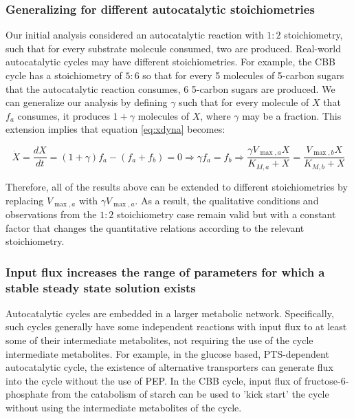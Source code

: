     \subsubsection{Generalizing for different autocatalytic stoichiometries}
    Our initial analysis considered an autocatalytic reaction with $1:2$ stoichiometry, such that for every substrate molecule consumed, two are produced.
    Real-world autocatalytic cycles may have different stoichiometries.
    For example, the CBB cycle has a stoichiometry of $5:6$ so that for every 5 molecules of 5-carbon sugars that the autocatalytic reaction consumes, 6 5-carbon sugars are produced.
    We can generalize our analysis by defining $\gamma$ such that for every molecule of $X$ that $f_a$ consumes, it produces $1+\gamma$ molecules of $X$, where $\gamma$ may be a fraction.
    This extension implies that equation \eqref{eq:xdyna} becomes:

    \begin{equation*}
      \dot X = \frac{dX}{dt} = (1+\gamma)f_a - (f_a + f_b) = 0 \Rightarrow \gamma f_a = f_b \Rightarrow \frac{\gamma V_{\max,a}X}{K_{M,a}+X}=\frac{V_{\max,b}X}{K_{M,b}+X}
    \end{equation*}

    Therefore, all of the results above can be extended to different stoichiometries by replacing $V_{\max,a}$ with $\gamma V_{\max,a}$.
    As a result, the qualitative conditions and observations from the $1:2$ stoichiometry case remain valid but with a constant factor that changes the quantitative relations according to the relevant stoichiometry.
\subsubsection{Input flux increases the range of parameters for which a stable steady state solution exists}
    Autocatalytic cycles are embedded in a larger metabolic network.
    Specifically, such cycles generally have some independent reactions with input flux to at least some of their intermediate metabolites, not requiring the use of the cycle intermediate metabolites.
    For example, in the glucose based, PTS-dependent autocatalytic cycle, the existence of alternative transporters can generate flux into the cycle without the use of PEP.
    In the CBB cycle, input flux of fructose-6-phosphate from the catabolism of starch can be used to 'kick start' the cycle without using the intermediate metabolites of the cycle.

